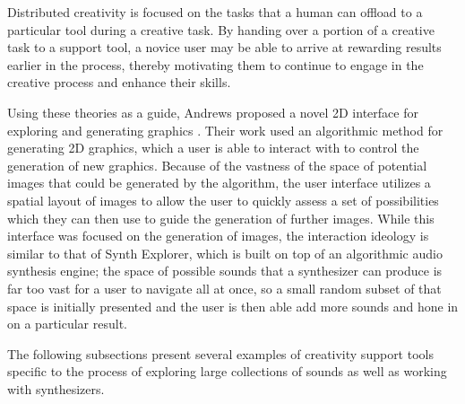 Distributed creativity is focused on the tasks that a human can offload to a particular tool during a creative task. By handing over a portion of a creative task to a support tool, a novice user may be able to arrive at rewarding results earlier in the process, thereby motivating them to continue to engage in the creative process and enhance their skills.

Using these theories as a guide, Andrews proposed a novel 2D interface for exploring and generating graphics \cite{10.1145/3325480.3325506}. Their work used an algorithmic method for generating 2D graphics, which a user is able to interact with to control the generation of new graphics. Because of the vastness of the space of potential images that could be generated by the algorithm, the user interface utilizes a spatial layout of images to allow the user to quickly assess a set of possibilities which they can then use to guide the generation of further images. While this interface was focused on the generation of images, the interaction ideology is similar to that of Synth Explorer, which is built on top of an algorithmic audio synthesis engine; the space of possible sounds that a synthesizer can produce is far too vast for a user to navigate all at once, so a small random subset of that space is initially presented and the user is then able add more sounds and hone in on a particular result.

The following subsections present several examples of creativity support tools specific to the process of exploring large collections of sounds as well as working with synthesizers.

